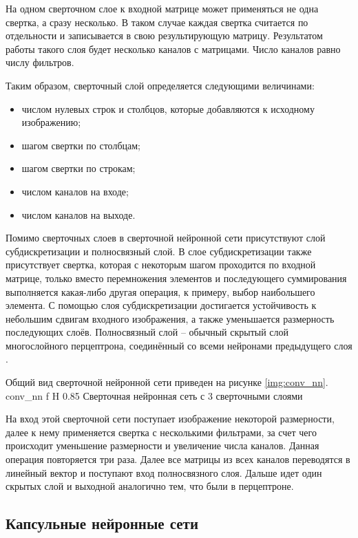На одном сверточном слое к входной матрице может применяться не одна свертка, а сразу несколько. В таком случае каждая свертка считается по отдельности и записывается в свою результирующую матрицу. Результатом работы такого слоя будет несколько каналов с матрицами. Число каналов равно числу фильтров.

Таким образом, сверточный слой определяется следующими величинами:
\begin{itemize}
	\item числом нулевых строк и столбцов, которые добавляются к исходному изображению;
	\item шагом свертки по столбцам;
	\item шагом свертки по строкам;
	\item числом каналов на входе;
	\item числом каналов на выходе.
\end{itemize}

Помимо сверточных слоев в сверточной нейронной сети присутствуют слой субдискретизации и полносвязный слой. В слое субдискретизации также присутствует свертка, которая с некоторым шагом проходится по входной матрице, только вместо перемножения элементов и последующего суммирования выполняется какая-либо другая операция, к примеру, выбор наибольшего элемента. С помощью слоя субдискретизации достигается устойчивость к небольшим сдвигам входного изображения, а также
уменьшается размерность последующих слоёв. Полносвязный слой -- обычный скрытый слой многослойного перцептрона, соединённый со всеми нейронами предыдущего слоя \cite{svertka}.

Общий вид сверточной нейронной сети приведен на рисунке \ref{img:conv_nn}.
{conv_nn} %
{f} %
{H} %
{0.85\textwidth} %
{Сверточная нейронная сеть с 3 сверточными слоями} %

На вход этой сверточной сети поступает изображение некоторой размерности, далее к нему применяется свертка с несколькими фильтрами, за счет чего происходит уменьшение размерности и увеличение числа каналов. Данная операция повторяется три раза. Далее все матрицы из всех каналов переводятся в линейный вектор и поступают вход полносвязного слоя. Дальше идет один скрытых слой и выходной аналогично тем, что были в перцептроне.

\subsection{Капсульные нейронные сети}

